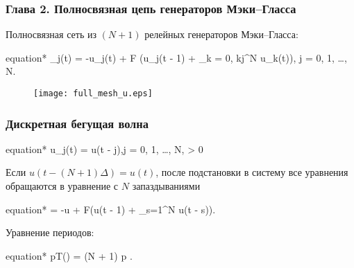 \begin{frame}
	\frametitle{Глава 2. Полносвязная цепь генераторов Мэки--Гласса}
	
	Полносвязная сеть из $(N + 1)$ релейных генераторов Мэки--Гласса:
	
	\begin{empheq}[box=\myeq]{equation*}
		_j(t) = -\beta u_j(t) + \alpha F \bigg(u_j(t - 1) + \sum\limits_{k = 0, k\neq j}^N u_k(t)\bigg), \quad j = 0, 1, \dots, N.
	\end{empheq}
	
	\begin{figure}
		\centering
		\texttt{[image: full\_mesh\_u.eps]}
	\end{figure}
\end{frame}


\begin{frame}
	\frametitle{Дискретная бегущая волна}
	
	\begin{empheq}[box=\myeq]{equation*}
		u_j(t) = u(t - j\Delta),\quad j = 0, 1, \ldots, N,  \Delta > 0 
	\end{empheq}
	
	Если $u\left(t - (N + 1)\Delta\right) = u(t)$, после подстановки в систему все уравнения обращаются в уравнение с $N$ запаздываниями
	
	\begin{empheq}[box=\myeq]{equation*}
		\label{eq:mg_aux1}
		 = -\beta u + \alpha F\left(u(t - 1) + \sum_{s=1}^{N} u(t - s\Delta)\right). 
	\end{empheq}
	
	Уравнение периодов:
	
	\begin{empheq}[box=\myeq]{equation*}
		pT(\Delta) = (N + 1)\Delta \quad {} p \in {}.
	\end{empheq}
	
	
\end{frame}

